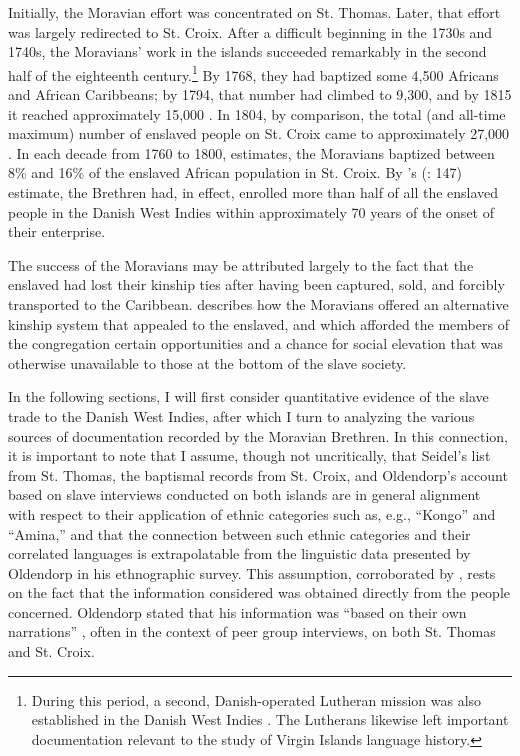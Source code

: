 \documentclass[output=paper,colorlinks,citecolor=brown]{langscibook}
\begin{document}
Initially, the Moravian effort was concentrated on St. Thomas. Later, that effort was largely redirected to St. Croix. After a difficult beginning in the 1730s and 1740s, the Moravians’ work in the islands succeeded remarkably in the second half of the eighteenth century.\footnote{During this period, a second, Danish-operated Lutheran mission was also established in the Danish West Indies \citep[see, e.g.,][]{Larsen_1950}. The Lutherans likewise left important documentation relevant to the study of Virgin Islands language history.} By 1768, they had baptized some 4,500 Africans and African Caribbeans; by 1794, that number had climbed to 9,300, and by 1815 it reached approximately 15,000 \citep[146–47]{Highfield_1994}. In 1804, by comparison, the total (and all-time maximum) number of enslaved people on St. Croix came to approximately 27,000 \citep[151]{Simonsen_Olsen_2017}. In each decade from 1760 to 1800, \citet[190]{Simonsen_2017} estimates, the Moravians baptized between 8\% and 16\% of the enslaved African population in St. Croix. By \citeauthor{Highfield_1994}’s (\citeyear{Highfield_1994}: 147) estimate, the Brethren had, in effect, enrolled more than half of all the enslaved people in the Danish West Indies within approximately 70 years of the onset of their enterprise.

The success of the Moravians may be attributed largely to the fact that the enslaved had lost their kinship ties after having been captured, sold, and forcibly transported to the Caribbean. \citet[92--95]{Sensbach_2005} describes how the Moravians offered an alternative kinship system that appealed to the enslaved, and which afforded the members of the congregation certain opportunities and a chance for social elevation that was otherwise unavailable to those at the bottom of the slave society.

In the following sections, I will first consider quantitative evidence of the slave trade to the Danish West Indies, after which I turn to analyzing the various sources of documentation recorded by the Moravian Brethren. In this connection, it is important to note that I assume, though not uncritically, that Seidel’s list from St. Thomas, the baptismal records from St. Croix, and Oldendorp’s account based on slave interviews conducted on both islands are in general alignment with respect to their application of ethnic categories such as, e.g., “Kongo” and “Amina,” and that the connection between such ethnic categories and their correlated languages is extrapolatable from the linguistic data presented by Oldendorp in his ethnographic survey. This assumption, corroborated by \citet[190--191]{Simonsen_2017}, rests on the fact that the information considered was obtained directly from the people concerned. Oldendorp stated that his information was “based on their own narrations” \citep[159]{Highfield_1987}, often in the context of peer group interviews, on both St. Thomas and St. Croix.
\end{document}
